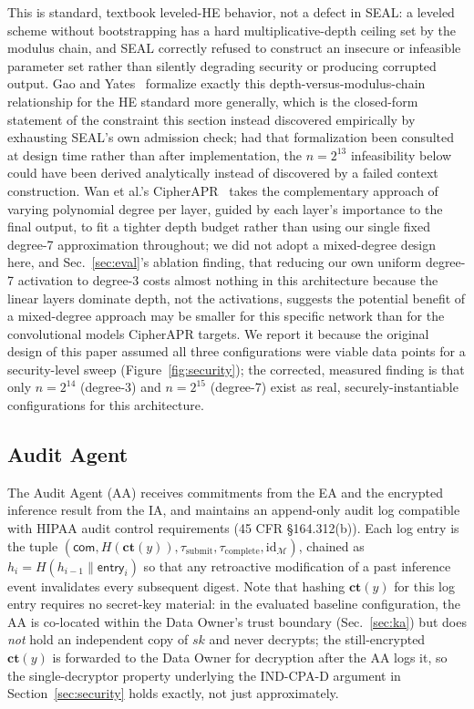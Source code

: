 \documentclass[journal,compsoc]{IEEEtran}
\newcommand{\Mod}{\mathcal{M}}
\begin{document}
This is standard, textbook leveled-HE behavior, not a defect in SEAL: a
leveled scheme without bootstrapping has a hard multiplicative-depth ceiling
set by the modulus chain, and SEAL correctly refused to construct an insecure
or infeasible parameter set rather than silently degrading security or
producing corrupted output. Gao and Yates~\cite{gao2025leveledhe} formalize
exactly this depth-versus-modulus-chain relationship for the HE standard
more generally, which is the closed-form statement of the constraint this
section instead discovered empirically by exhausting SEAL's own admission
check; had that formalization been consulted at design time rather than
after implementation, the $n=2^{13}$ infeasibility below could have been
derived analytically instead of discovered by a failed context construction.
Wan et al.'s CipherAPR~\cite{wan2026cipherapr} takes the complementary
approach of varying polynomial degree per layer, guided by each layer's
importance to the final output, to fit a tighter depth budget rather than
using our single fixed degree-7 approximation throughout; we did not adopt
a mixed-degree design here, and Sec.~\ref{sec:eval}'s ablation finding, that
reducing our own uniform degree-7 activation to degree-3 costs almost
nothing in this architecture because the linear layers dominate depth, not
the activations, suggests the potential benefit of a mixed-degree approach
may be smaller for this specific network than for the convolutional models
CipherAPR targets. We report it because the original design of this
paper assumed all three configurations were viable data points for a
security-level sweep (Figure~\ref{fig:security}); the corrected, measured
finding is that only $n=2^{14}$ (degree-3) and $n=2^{15}$ (degree-7) exist as
real, securely-instantiable configurations for this architecture.

\subsection{Audit Agent}

The Audit Agent (AA) receives commitments from the EA and the encrypted
inference result from the IA, and maintains an append-only audit log compatible
with HIPAA audit control requirements (45 CFR \S164.312(b)). Each log entry is
the tuple $(\mathsf{com}, H(\mathbf{ct}(y)), \tau_{\mathrm{submit}},
\tau_{\mathrm{complete}}, \mathrm{id}_{\Mod})$, chained as
$h_i = H(h_{i-1} \| \mathsf{entry}_i)$ so that any retroactive modification of
a past inference event invalidates every subsequent digest. Note that hashing
$\mathbf{ct}(y)$ for this log entry requires no secret-key material: in the
evaluated baseline configuration, the AA is co-located within the Data
Owner's trust boundary (Sec.~\ref{sec:ka}) but does \emph{not} hold an
independent copy of $sk$ and never decrypts; the still-encrypted
$\mathbf{ct}(y)$ is forwarded to the Data Owner for decryption after the
AA logs it, so the single-decryptor property underlying the IND-CPA-D
argument in Section~\ref{sec:security} holds exactly, not just
approximately.
\end{document}

